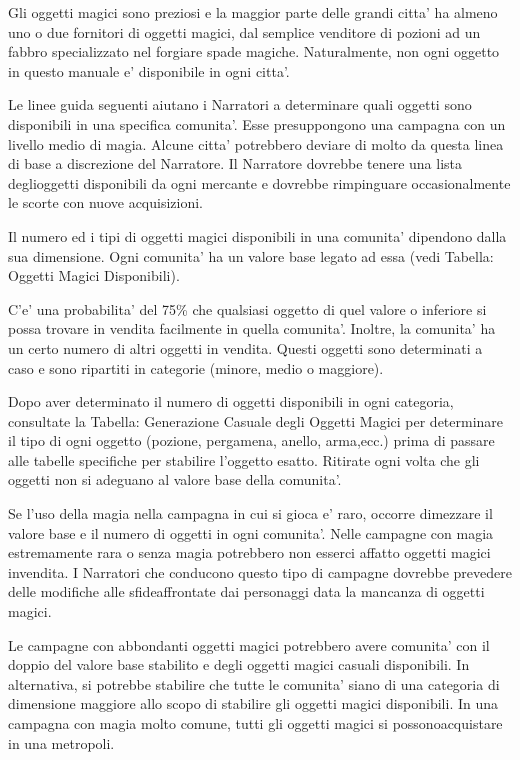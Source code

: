 \documentclass[a4paper,11pt,twoside,openany]{book}
\begin{document}
{		\bigskip
		
		Gli oggetti magici sono preziosi e la maggior parte delle grandi citta' ha almeno uno o due fornitori di oggetti magici, dal semplice venditore di pozioni ad un fabbro specializzato nel forgiare spade magiche. Naturalmente, non ogni oggetto in questo manuale e' disponibile in ogni citta'.
		
		Le linee guida seguenti aiutano i Narratori a determinare quali oggetti sono disponibili in una specifica comunita'. Esse presuppongono una campagna con un livello medio di magia. Alcune citta' potrebbero deviare di molto da questa linea di base a discrezione del Narratore. Il Narratore dovrebbe tenere una lista deglioggetti disponibili da ogni mercante e dovrebbe rimpinguare occasionalmente le scorte con nuove acquisizioni.
		
		Il numero ed i tipi di oggetti magici disponibili in una comunita' dipendono dalla sua dimensione. Ogni comunita' ha un valore base legato ad essa (vedi Tabella: Oggetti Magici Disponibili).
		
		C'e' una probabilita' del 75\% che qualsiasi oggetto di quel valore o inferiore si possa trovare in vendita facilmente in quella comunita'. Inoltre, la comunita' ha un certo numero di altri oggetti in vendita. Questi oggetti sono determinati a caso e sono ripartiti in categorie (minore, medio o maggiore).
		
		Dopo aver determinato il numero di oggetti disponibili in ogni categoria, consultate la Tabella: Generazione Casuale degli Oggetti Magici per determinare il tipo di ogni oggetto (pozione, pergamena, anello, arma,ecc.) prima di passare alle tabelle specifiche per stabilire l'oggetto esatto. Ritirate ogni volta che gli oggetti non si adeguano al valore base della comunita'.
		
		Se l'uso della magia nella campagna in cui si gioca e' raro, occorre dimezzare il valore base e il numero di oggetti in ogni comunita'. Nelle campagne con magia estremamente rara o senza magia potrebbero non esserci affatto oggetti magici invendita. I Narratori che conducono questo tipo di campagne dovrebbe prevedere delle modifiche alle sfideaffrontate dai personaggi data la mancanza di oggetti magici.
		
		Le campagne con abbondanti oggetti magici potrebbero avere comunita' con il doppio del valore base stabilito e degli oggetti magici casuali disponibili. In alternativa, si potrebbe stabilire che tutte le comunita' siano di una categoria di dimensione maggiore allo scopo di stabilire gli oggetti magici disponibili. In una campagna con magia molto comune, tutti gli oggetti magici si possonoacquistare in una metropoli.
		
}
\end{document}
